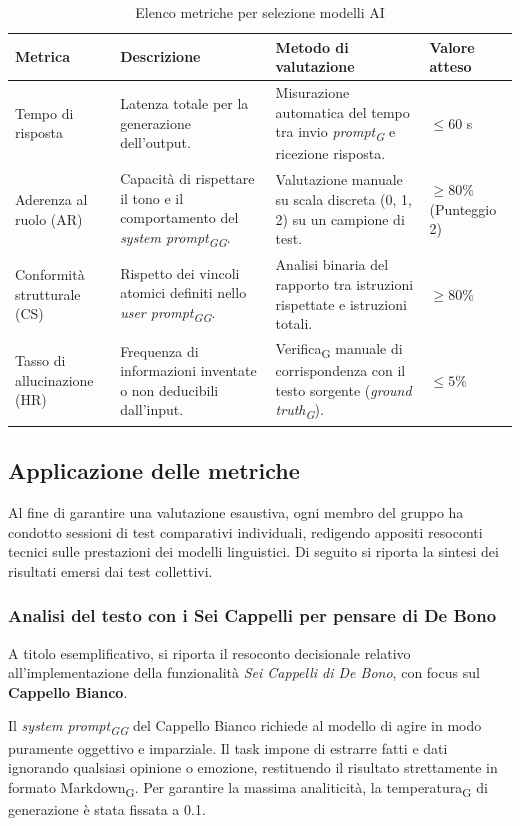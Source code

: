 \documentclass[11pt,a4paper]{article}
\newcommand{\gls}[1]{#1\textsubscript{G}}
\begin{document}
\begin{table}[H]
\centering
\renewcommand{\arraystretch}{1.5}
\begin{tabular}{|M{0.22\textwidth}|M{0.28\textwidth}|M{0.28\textwidth}|M{0.18\textwidth}|}
\hline
\textbf{Metrica} & \textbf{Descrizione} & \textbf{Metodo di valutazione} & \textbf{Valore atteso} \\
\hline
    Tempo di risposta & Latenza totale per la generazione dell'output. & Misurazione automatica del tempo tra invio \textit{\gls{prompt}} e ricezione risposta. & $\le 60$ s \\
    \hline
    Aderenza al ruolo (AR) & Capacità di rispettare il tono e il comportamento del \textit{\gls{system \gls{prompt}}}. & Valutazione manuale su scala discreta (0, 1, 2) su un campione di test. & $\ge 80\%$ (Punteggio 2) \\
    \hline
    Conformità strutturale (CS) & Rispetto dei vincoli atomici definiti nello \textit{\gls{user \gls{prompt}}}. & Analisi binaria del rapporto tra istruzioni rispettate e istruzioni totali. & $\ge 80\%$ \\
    \hline
    Tasso di allucinazione (HR) & Frequenza di informazioni inventate o non deducibili dall'input. & \gls{Verifica} manuale di corrispondenza con il testo sorgente (\textit{\gls{ground truth}}). & $\le 5\%$ \\
    \hline
\end{tabular}
\caption{Elenco metriche per selezione modelli AI}
\end{table}

\subsection{Applicazione delle metriche}
Al fine di garantire una valutazione esaustiva, ogni membro del gruppo ha condotto sessioni di test comparativi individuali, redigendo appositi resoconti tecnici sulle prestazioni dei modelli linguistici.
Di seguito si riporta la sintesi dei risultati emersi dai test collettivi.

\subsubsection{Analisi del testo con i Sei Cappelli per pensare di De Bono}
A titolo esemplificativo, si riporta il resoconto decisionale relativo all'implementazione della funzionalità \textit{Sei Cappelli di De Bono}, con focus sul \textbf{Cappello Bianco}.

Il \textit{\gls{system \gls{prompt}}} del Cappello Bianco richiede al modello di agire in modo puramente oggettivo e imparziale. Il task impone di estrarre fatti e dati ignorando qualsiasi opinione o emozione, restituendo il risultato strettamente in formato \gls{Markdown}. Per garantire la massima analiticità, la \gls{temperatura} di generazione è stata fissata a 0.1.
\end{document}
